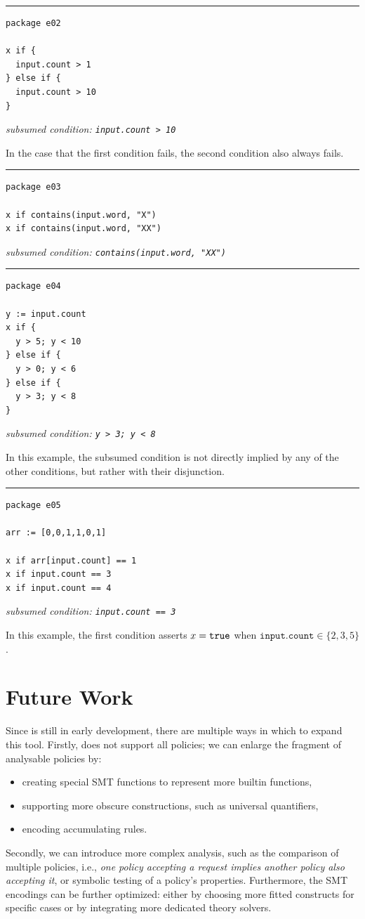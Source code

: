 \noindent\rule{\linewidth}{0.4pt}
\begin{lstlisting}
package e02

x if {
  input.count > 1
} else if {
  input.count > 10
}
\end{lstlisting}
\textit{subsumed condition: \texttt{input.count > 10}}

In the case that the first condition fails, the second condition also always fails.

\noindent\rule{\linewidth}{0.4pt}
\begin{lstlisting}
package e03

x if contains(input.word, "X")
x if contains(input.word, "XX")
\end{lstlisting}
\textit{subsumed condition: \texttt{contains(input.word, "XX")}}

\noindent\rule{\linewidth}{0.4pt}
\begin{lstlisting}
package e04

y := input.count
x if {
  y > 5; y < 10
} else if {
  y > 0; y < 6
} else if {
  y > 3; y < 8
}
\end{lstlisting}
\textit{subsumed condition: \texttt{y > 3; y < 8}}

In this example, the subsumed condition is not directly implied by any of the other conditions, but rather with their disjunction.

\noindent\rule{\linewidth}{0.4pt}
\begin{lstlisting}
package e05

arr := [0,0,1,1,0,1]

x if arr[input.count] == 1
x if input.count == 3
x if input.count == 4
\end{lstlisting}
\textit{subsumed condition: \texttt{input.count == 3}}

In this example, the first condition asserts $x = \texttt{true}$ when $\texttt{input.count} \in \{2,3,5\}$.

\section{Future Work}

Since \verirego is still in early development, there are multiple ways in which to expand this tool.
Firstly, \verirego does not support all \rego policies; we can enlarge the fragment of analysable policies by:
\begin{itemize}
  \item creating special SMT functions to represent more builtin functions,
  \item supporting more obscure \rego constructions, such as universal quantifiers,
  \item encoding accumulating rules.
\end{itemize}
Secondly, we can introduce more complex analysis, such as the comparison of multiple policies, i.e., \textit{one policy accepting a request implies another policy also accepting it}, or symbolic testing of a policy's properties.
Furthermore, the SMT encodings can be further optimized: either by choosing more fitted constructs for specific cases or by integrating more dedicated theory solvers.
